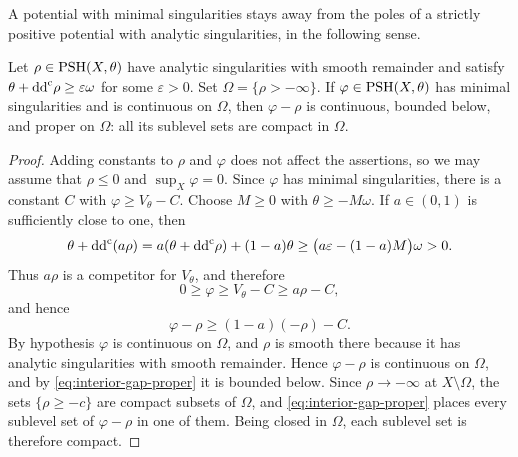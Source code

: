 

A potential with minimal singularities stays away from the poles of a strictly positive potential with analytic singularities, in the following sense.

\begin{lemma}\label{lem:interior-proper-gap}
Let $\rho\in\mathrm{PSH}(X,\theta)$ have analytic singularities with smooth remainder and satisfy $\theta+\mathrm{dd}^{\mathrm{c}}\rho\geq\varepsilon\omega$ for some $\varepsilon>0$. Set $\Omega=\{\rho>-\infty\}$. If $\varphi\in\mathrm{PSH}(X,\theta)$ has minimal singularities and is continuous on $\Omega$, then $\varphi-\rho$ is continuous, bounded below, and proper on $\Omega$: all its sublevel sets are compact in $\Omega$.
\end{lemma}

\begin{proof}
Adding constants to $\rho$ and $\varphi$ does not affect the assertions, so we may assume that $\rho\leq0$ and $\sup_X\varphi=0$. Since $\varphi$ has minimal singularities, there is a constant $C$ with $\varphi\geq V_\theta-C$. Choose $M\geq0$ with $\theta\geq-M\omega$. If $a\in(0,1)$ is sufficiently close to one, then
\[
  \theta+\mathrm{dd}^{\mathrm{c}}(a\rho)
  =a(\theta+\mathrm{dd}^{\mathrm{c}}\rho)+(1-a)\theta
  \geq\bigl(a\varepsilon-(1-a)M\bigr)\omega>0.
\]
Thus $a\rho$ is a competitor for $V_\theta$, and therefore
\[
  0\geq\varphi\geq V_\theta-C\geq a\rho-C,
\]
and hence
\begin{equation}\label{eq:interior-gap-proper}
  \varphi-\rho\geq(1-a)(-\rho)-C.
\end{equation}
By hypothesis $\varphi$ is continuous on $\Omega$, and $\rho$ is smooth there because it has analytic singularities with smooth remainder. Hence $\varphi-\rho$ is continuous on $\Omega$, and by \eqref{eq:interior-gap-proper} it is bounded below. Since $\rho\to-\infty$ at $X\setminus\Omega$, the sets $\{\rho\geq-c\}$ are compact subsets of $\Omega$, and \eqref{eq:interior-gap-proper} places every sublevel set of $\varphi-\rho$ in one of them. Being closed in $\Omega$, each sublevel set is therefore compact.
\end{proof}


